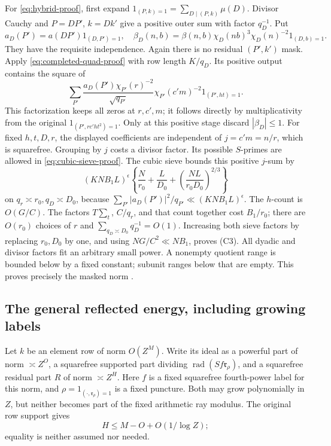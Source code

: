 \documentclass[12pt]{article}
\begin{document}
For \eqref{eq:hybrid-proof}, first expand
\(1_{(P,k)=1}=\sum_{D\mid(P,k)}\mu(D)\).
Divisor Cauchy and \(P=DP'\), \(k=Dk'\) give a positive outer
sum with factor \(q_D^{-1}\).
Put
\[
 a_D(P')=a(DP')1_{(D,P')=1},\quad
 \beta_D(n,b)=\beta(n,b)\chi_D(nb)^3\chi_D(n)^{-2}1_{(D,b)=1}.
\]
They have the requisite independence.  Again there is no residual
\((P',k')\) mask.  Apply \eqref{eq:completed-quad-proof} with
row length \(K/q_D\).  Its positive output contains the square
of
\[
 \sum_{P'}\frac{a_D(P')\chi_{P'}(r)^{-2}}{\sqrt{q_{P'}}}
           \chi_{P'}(c'm)^{-2}1_{(P',ht)=1}.
\]
This factorization keeps all zeros at \(r,c',m\); it follows
directly by multiplicativity from the original
\(1_{(P',rc'ht^2)=1}\).
Only at this positive stage discard \(|\beta_D|\le1\).
For fixed \(h,t,D,r\), the displayed coefficients are independent
of \(j=c'm=n/r\), which is squarefree.
Grouping by \(j\) costs a divisor factor.  Its possible
\(S\)-primes are allowed in \eqref{eq:cubic-sieve-proof}.
The cubic sieve bounds this positive \(j\)-sum by
\[
 (KNB_1L)^\epsilon
 \left\{\frac N{r_0}+\frac L{D_0}
                    +\left(\frac{NL}{r_0D_0}\right)^{2/3}\right\}
\]
on \(q_r\asymp r_0,q_D\asymp D_0\), because
\(\sum_{P'}|a_D(P')|^2/q_{P'}\ll (KNB_1L)^\epsilon\).
The \(h\)-count is \(O(G/C)\).
The factors \(T\sum_t\), \(C/q_r\), and that count together
cost \(B_1/r_0\); there are \(O(r_0)\) choices of \(r\) and
\(\sum_{q_D\asymp D_0}q_D^{-1}=O(1)\).
Increasing both sieve factors by replacing \(r_0,D_0\) by one,
and using \(NG/C^2\ll NB_1\), proves (C3).
All dyadic and divisor factors fit an arbitrary small power.
A nonempty quotient range is bounded below by a fixed constant;
subunit ranges below that are empty.  This proves precisely the
masked norm \cite[Lemma 14.2]{QRH}.

\subsection{The general reflected energy, including growing labels}
\label{app:general-energy}

Let \(k\) be an element row of norm \(O(Z^M)\).
Write its ideal as a powerful part of norm \(\asymp Z^O\),
a squarefree supported part dividing \(\operatorname{rad}(Sf\mathfrak r_\rho)\),
and a squarefree residual part \(R\) of norm \(\asymp Z^H\).
Here \(f\) is a fixed squarefree fourth-power label for this norm,
and \(\rho=1_{(\cdot,\mathfrak r_\rho)=1}\) is a fixed puncture.
Both may grow polynomially in \(Z\), but neither becomes part of
the fixed arithmetic ray modulus.  The original row support gives
\[
 H\le M-O+O(1/\log Z);
 \tag{C5}\label{own:actual-row-dyad}
\]
equality is neither assumed nor needed.
\end{document}
